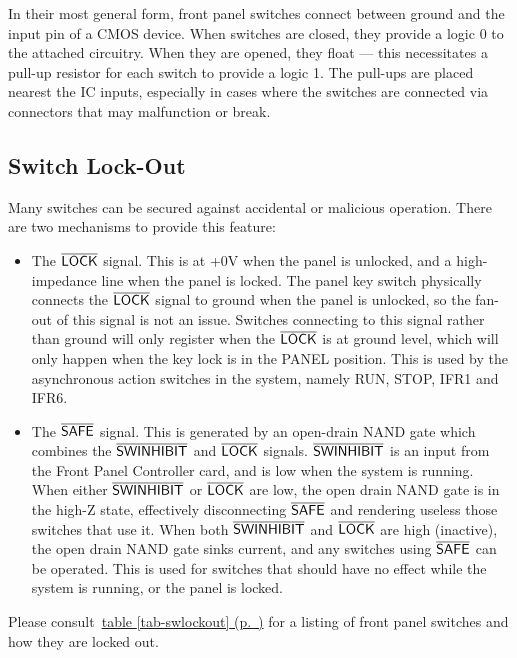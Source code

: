 \documentclass[11pt,a4paper,twocolumns]{article}
\newcommand{\cf}[2][section]{\hyperref[#2]{#1 \ref*{#2} (p.~\pageref*{#2})}}
\newcommand{\tcf}[1]{\cf[table]{#1}}
\newcommand{\ns}[1]{$\overline{\mbox{\textsf{{#1}}}}$}
\newcommand{\sw}[1]{\textsf{#1}}
\begin{document}
In their most general form, front panel switches connect between ground and the
input pin of a CMOS device. When switches are closed, they provide a logic 0 to
the attached circuitry. When they are opened, they float — this necessitates a
pull-up resistor for each switch to provide a logic 1. The pull-ups are placed
nearest the IC inputs, especially in cases where the switches are connected via
connectors that may malfunction or break.

\subsection{Switch Lock-Out}

Many switches can be secured against accidental or malicious operation. There
are two mechanisms to provide this feature:

\begin{itemize}
  \item The \ns{LOCK} signal. This is at +0V when the panel is unlocked, and a
    high-impedance line when the panel is locked.  The panel key switch
    physically connects the \ns{LOCK} signal to ground when the panel is
    unlocked, so the fan-out of this signal is not an issue.  Switches
    connecting to this signal rather than ground will only register when the
    \ns{LOCK} is at ground level, which will only happen when the key lock is
    in the \sw{PANEL} position.  This is used by the asynchronous action
    switches in the system, namely \sw{RUN}, \sw{STOP}, \sw{IFR1} and
    \sw{IFR6}.

  \item The \ns{SAFE} signal. This is generated by an open-drain NAND gate
    which combines the \ns{SWINHIBIT} and \ns{LOCK} signals. \ns{SWINHIBIT} is
    an input from the Front Panel Controller card, and is low when the system
    is running. When either \ns{SWINHIBIT} or \ns{LOCK} are low, the open drain
    NAND gate is in the high-Z state, effectively disconnecting \ns{SAFE} and
    rendering useless those switches that use it. When both \ns{SWINHIBIT} and
    \ns{LOCK} are high (inactive), the open drain NAND gate sinks current, and
    any switches using \ns{SAFE} can be operated. This is used for switches
    that should have no effect while the system is running, or the panel is
    locked.
\end{itemize}

Please consult~\tcf{tab-swlockout} for a listing of front panel switches and
how they are locked out.
\end{document}
